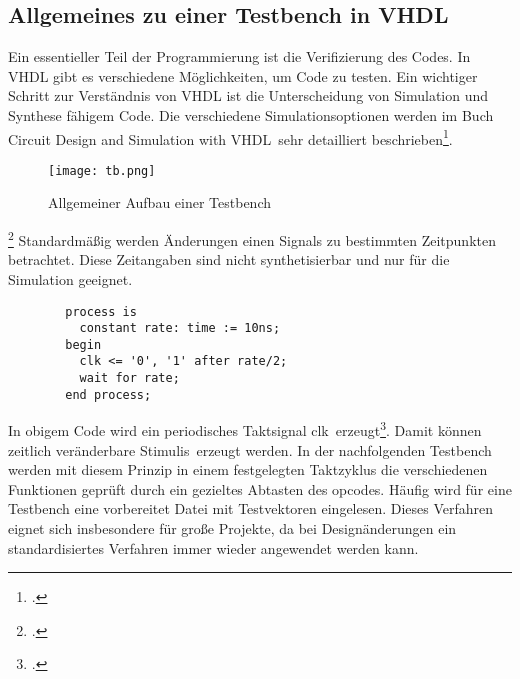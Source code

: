 \documentclass[12pt,a4paper]{scrartcl}	%
\begin{document}
\subsection{Allgemeines zu einer Testbench in VHDL}
Ein essentieller Teil der Programmierung ist die Verifizierung des Codes. In VHDL gibt es verschiedene Möglichkeiten, um Code zu testen. Ein wichtiger Schritt zur Verständnis von VHDL ist die Unterscheidung von Simulation und Synthese fähigem Code. Die verschiedene Simulationsoptionen werden im Buch \glqq Circuit Design and Simulation with VHDL\grqq~sehr detailliert beschrieben\footcite[vgl.][S. 241 ff.]{VHDL}.
\begin{figure}[h]
	\centering
	\texttt{[image: tb.png]}
	\caption[Allgemeiner Aufbau einer Testbench]{Allgemeiner Aufbau einer Testbench\footnotemark}
\end{figure}
\footcitetext[vgl.][Abruf am 23.11.2017]{bu}
Standardmäßig werden Änderungen einen Signals zu bestimmten Zeitpunkten betrachtet. Diese Zeitangaben sind nicht synthetisierbar und nur für die Simulation geeignet.
\newpage
\begin{lstlisting}
		process is
		  constant rate: time := 10ns;
		begin
		  clk <= '0', '1' after rate/2;
		  wait for rate;
		end process;
\end{lstlisting}
In obigem Code wird ein periodisches Taktsignal \glqq clk\grqq~erzeugt\footcite[vgl.][S. 60]{Kom}. Damit können zeitlich veränderbare \glqq Stimulis\grqq~erzeugt werden. In der nachfolgenden Testbench werden mit diesem Prinzip in einem festgelegten Taktzyklus die verschiedenen Funktionen geprüft durch ein gezieltes Abtasten des \glqq opcodes\grqq. Häufig wird für eine Testbench eine vorbereitet Datei mit Testvektoren eingelesen. Dieses Verfahren eignet sich insbesondere für große Projekte, da bei Designänderungen ein standardisiertes Verfahren immer wieder angewendet werden kann.
\end{document}
